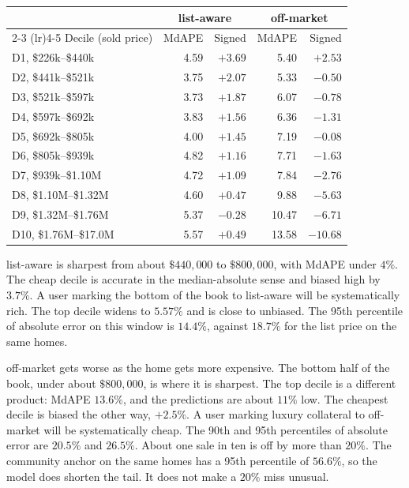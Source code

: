 \documentclass[11pt]{article}
\newcommand{\la}{list-aware}
\newcommand{\om}{off-market}
\begin{document}
\begin{center}
\small
\begin{tabular}{l rr rr}
\toprule
 & \multicolumn{2}{c}{\la} & \multicolumn{2}{c}{\om} \\
\cmidrule(lr){2-3} \cmidrule(lr){4-5}
Decile (sold price) & MdAPE & Signed & MdAPE & Signed \\
\midrule
D1, \$226k--\$440k & 4.59 & \(+3.69\) & 5.40 & \(+2.53\) \\
D2, \$441k--\$521k & 3.75 & \(+2.07\) & 5.33 & \(-0.50\) \\
D3, \$521k--\$597k & 3.73 & \(+1.87\) & 6.07 & \(-0.78\) \\
D4, \$597k--\$692k & 3.83 & \(+1.56\) & 6.36 & \(-1.31\) \\
D5, \$692k--\$805k & 4.00 & \(+1.45\) & 7.19 & \(-0.08\) \\
D6, \$805k--\$939k & 4.82 & \(+1.16\) & 7.71 & \(-1.63\) \\
D7, \$939k--\$1.10M & 4.72 & \(+1.09\) & 7.84 & \(-2.76\) \\
D8, \$1.10M--\$1.32M & 4.60 & \(+0.47\) & 9.88 & \(-5.63\) \\
D9, \$1.32M--\$1.76M & 5.37 & \(-0.28\) & 10.47 & \(-6.71\) \\
D10, \$1.76M--\$17.0M & 5.57 & \(+0.49\) & 13.58 & \(-10.68\) \\
\bottomrule
\end{tabular}
\end{center}

\la{} is sharpest from about \(\$440{,}000\) to \(\$800{,}000\), with MdAPE under \(4\%\). The cheap decile is accurate in the median-absolute sense and biased high by \(3.7\%\). A user marking the bottom of the book to \la{} will be systematically rich. The top decile widens to \(5.57\%\) and is close to unbiased. The 95th percentile of absolute error on this window is \(14.4\%\), against \(18.7\%\) for the list price on the same homes.

\om{} gets worse as the home gets more expensive. The bottom half of the book, under about \(\$800{,}000\), is where it is sharpest. The top decile is a different product: MdAPE \(13.6\%\), and the predictions are about \(11\%\) low. The cheapest decile is biased the other way, \(+2.5\%\). A user marking luxury collateral to \om{} will be systematically cheap. The 90th and 95th percentiles of absolute error are \(20.5\%\) and \(26.5\%\). About one sale in ten is off by more than \(20\%\). The community anchor on the same homes has a 95th percentile of \(56.6\%\), so the model does shorten the tail. It does not make a \(20\%\) miss unusual.
\end{document}
